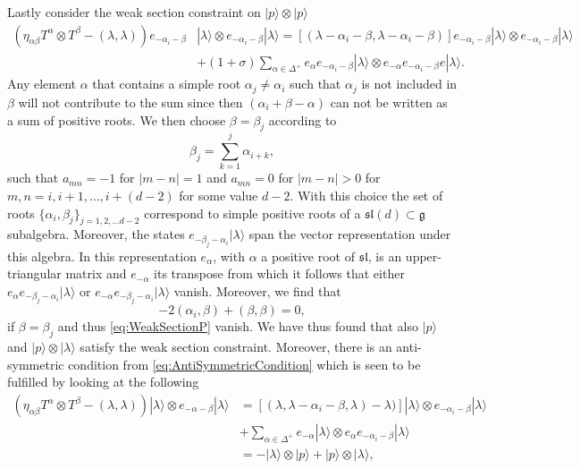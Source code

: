 Lastly consider the weak section constraint on $|p\rangle\otimes|p\rangle$ 
\begin{equation}\label{eq:WeakSectionP}
    \begin{aligned}
    \left(\eta_{\alpha\beta}T^\alpha\otimes T^\beta-(\lambda,\lambda)\right)e_{-\alpha_i-\beta}&|\lambda\rangle \otimes e_{-\alpha_i-\beta}|\lambda\rangle = [(\lambda-\alpha_i-\beta,\lambda-\alpha_i-\beta)]e_{-\alpha_i-\beta}|\lambda\rangle\otimes e_{-\alpha_i-\beta}|\lambda\rangle\\
    &+(1+\sigma)\sum_{\alpha\in\Delta^{+}} e_{\alpha}e_{-\alpha_i-\beta}|\lambda\rangle\otimes e_{-\alpha}e_{-\alpha_i-\beta}e|\lambda\rangle.
    \end{aligned}
\end{equation}
Any element $\alpha$ that contains a simple root $\alpha_j\neq \alpha_i$ such that $\alpha_j$ is not included in $\beta$ will not contribute to the sum since then $(\alpha_i+\beta-\alpha)$ can not be written as a sum of positive roots. We then choose $\beta=\beta_j$ according to 
\begin{equation}
    \beta_j = \sum_{k=1}^j \alpha_{i+k},
\end{equation}
such that $a_{mn}=-1$ for $|m-n|=1$ and $a_{mn}=0$ for $|m-n|>0$ for $m,n=i,i+1,\ldots, i+(d-2)$ for some value $d-2$. With this choice the set of roots $\{\alpha_i,\beta_j\}_{j=1,2,\ldots d-2}$ correspond to simple positive roots of a $\mathfrak{sl}(d)\subset \mathfrak{g}$ subalgebra. Moreover, the states $e_{-\beta_j-\alpha_i}|\lambda\rangle$ span the vector representation under this algebra. In this representation $e_\alpha$, with $\alpha$ a positive root of $\mathfrak{sl}$, is an upper-triangular matrix and $e_{-\alpha}$ its transpose from which it follows that either $e_\alpha e_{-\beta_j-\alpha_i}|\lambda\rangle$ or $e_{-\alpha}e_{-\beta_j-\alpha_i}|\lambda\rangle$ vanish. Moreover, we find that 
\begin{equation}
    -2(\alpha_i,\beta)+(\beta,\beta)=0,
\end{equation}
if $\beta=\beta_j$ and thus \eqref{eq:WeakSectionP} vanish. We have thus found that also $|p\rangle$ and $|p\rangle\otimes|\lambda\rangle$ satisfy the weak section constraint. 
Moreover, there is an anti-symmetric condition from \eqref{eq:AntiSymmetricCondition} which is seen to be fulfilled by looking at the following 
\begin{equation}
    \begin{aligned}
    \left(\eta_{\alpha\beta}T^\alpha\otimes T^\beta-(\lambda,\lambda)\right)|\lambda\rangle \otimes e_{-\alpha-\beta}|\lambda\rangle &= [(\lambda,\lambda-\alpha_i-\beta,\lambda)-\lambda)]|\lambda\rangle\otimes e_{-\alpha_i-\beta}|\lambda\rangle \\
    &+\sum_{\alpha\in \Delta^+}e_{-\alpha}|\lambda\rangle \otimes e_{\alpha} e_{-\alpha_i-\beta}|\lambda\rangle\\
    &= -|\lambda\rangle \otimes |p\rangle +|p\rangle\otimes |\lambda\rangle,
    \end{aligned}
\end{equation}
